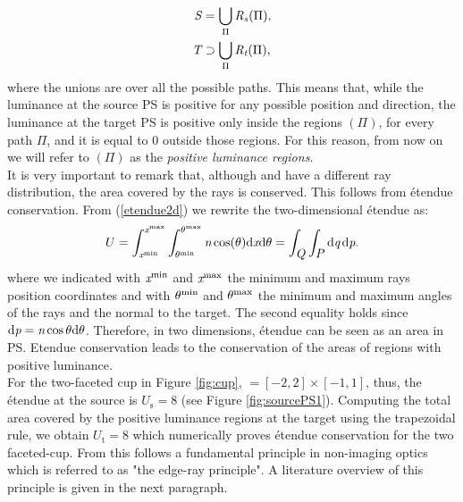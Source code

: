 \begin{equation}
\begin{aligned}
\mbox{$\emph{S}_{\textit{}}$} &= \bigcup_{\Pi} \mbox{$\emph{R}_{\textit{\textrm{s}}}$}(\Pi),\\
\mbox{$\emph{T}_{\textit{}}$} &\supset \bigcup_{\Pi} \mbox{$\emph{R}_{\textit{\textrm{t}}}$}(\Pi),
\end{aligned}
\end{equation}
where the unions are over all the possible paths.
This means that, while the luminance at the source PS is positive for any possible position and direction, the luminance at the target PS is positive only inside the regions $(\Pi)$, for every path $\Pi$, and it is equal to $0$ outside those regions. For this reason, from now on we will refer to $(\Pi)$ as the \textit{positive luminance regions}. \\ \indent
It is very important to remark that, although  and  have a different ray distribution, the area covered by the rays is conserved. This follows from \'{e}tendue conservation. From (\ref{etendue2d}) we rewrite the two-dimensional \'{e}tendue as:
\begin{equation}
U = \int_{\textit{x}^{\textrm{min}}}^{\textit{x}^{\textrm{max}}} \int_{\theta^{\textrm{min}}}^{\theta^{\textrm{max}}} \textit{n} \cos(\theta)\textrm{d}\textit{x}\textrm{d}\theta= \int_{\mbox{$\emph{Q}_{\textit{}}$}}\int_{\mbox{$\emph{P}_{\textit{}}$}} \textrm{d}\textit{q}\,\textrm{d}\textit{p}.
\end{equation}
where we indicated with $\textit{x}^{\textrm{min}}$ and $\textit{x}^{\textrm{max}}$ the minimum and maximum rays position coordinates and with $\theta^{\textrm{min}}$ and $\theta^{\textrm{max}}$ the minimum and maximum angles of the rays and the normal to the target. The second equality holds since $\textrm{d}\textit{p}= \textit{n}\cos \theta\textrm{d}\theta$.
Therefore, in two dimensions, \'{e}tendue can be seen as an area in PS. Etendue conservation leads to the conservation of the areas of regions with positive luminance.\\ \indent
For the two-faceted cup in Figure \ref{fig:cup}, $= [-2,2]\times[-1,1]$, thus, the \'{e}tendue at the source is $U_\textrm{s}=8$ (see Figure \ref{fig:sourcePS1}). Computing the total area covered by the positive luminance regions at the target using the trapezoidal rule, we obtain $U_\textrm{t}=8$ which numerically proves \'{e}tendue conservation for the two faceted-cup. 
From this follows a fundamental principle in non-imaging optics which is referred to as "the edge-ray principle". A literature overview of this principle is given in the next paragraph.
